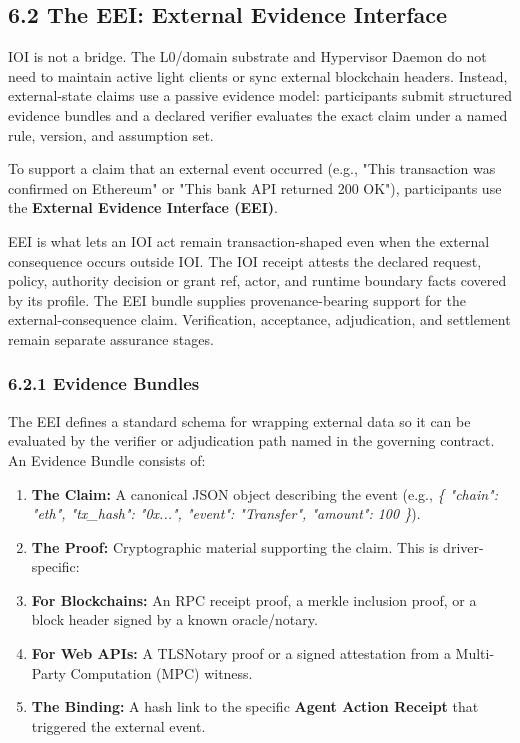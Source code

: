 \documentclass[
  11pt,
]{article}
\providecommand{\tightlist}{%
  \setlength{\itemsep}{0pt}\setlength{\parskip}{0pt}}
\begin{document}
\hypertarget{the-eei-external-evidence-interface}{%
\subsection{6.2 The EEI: External Evidence
Interface}\label{the-eei-external-evidence-interface}}

IOI is not a bridge. The L0/domain substrate and Hypervisor Daemon do not
need to maintain active light clients or sync external blockchain
headers. Instead, external-state claims use a passive evidence model:
participants submit structured evidence bundles and a declared verifier
evaluates the exact claim under a named rule, version, and assumption set.

To support a claim that an external event occurred (e.g., "This transaction
was confirmed on Ethereum" or "This bank API returned 200 OK"), participants
use the \textbf{External Evidence Interface (EEI)}.

EEI is what lets an IOI act remain transaction-shaped even when the
external consequence occurs outside IOI. The IOI receipt attests the declared
request, policy, authority decision or grant ref, actor, and runtime boundary
facts covered by its profile. The EEI bundle supplies provenance-bearing
support for the external-consequence claim. Verification, acceptance,
adjudication, and settlement remain separate assurance stages.

\hypertarget{evidence-bundles}{%
\subsubsection{6.2.1 Evidence Bundles}\label{evidence-bundles}}

The EEI defines a standard schema for wrapping external data so it can be
evaluated by the verifier or adjudication path named in the governing contract.
An Evidence Bundle consists of:

\begin{enumerate}
\def\labelenumi{\arabic{enumi}.}
\tightlist
\item
  \textbf{The Claim:} A canonical JSON object describing the event
  (e.g., \emph{\{ "chain": "eth", "tx\_hash": "0x...", "event":
  "Transfer", "amount": 100 \}}).
\item
  \textbf{The Proof: }Cryptographic material supporting the claim. This
  is driver-specific:
\item
  \textbf{For Blockchains:} An RPC receipt proof, a merkle inclusion
  proof, or a block header signed by a known oracle/notary.
\item
  \textbf{For Web APIs:} A TLSNotary proof or a signed attestation from
  a Multi-Party Computation (MPC) witness.
\item
  \textbf{The Binding:} A hash link to the specific \textbf{Agent Action
  Receipt }that triggered the external event.
\end{enumerate}
\end{document}
